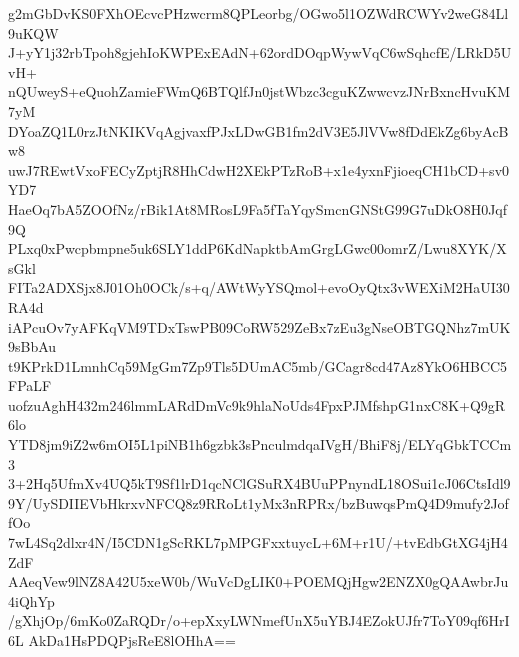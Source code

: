 g2mGbDvKS0FXhOEcvcPHzwcrm8QPLeorbg/OGwo5l1OZWdRCWYv2weG84Ll9uKQW
J+yY1j32rbTpoh8gjehIoKWPExEAdN+62ordDOqpWywVqC6wSqhcfE/LRkD5UvH+
nQUweyS+eQuohZamieFWmQ6BTQlfJn0jstWbzc3cguKZwwcvzJNrBxncHvuKM7yM
DYoaZQ1L0rzJtNKIKVqAgjvaxfPJxLDwGB1fm2dV3E5JlVVw8fDdEkZg6byAcBw8
uwJ7REwtVxoFECyZptjR8HhCdwH2XEkPTzRoB+x1e4yxnFjioeqCH1bCD+sv0YD7
HaeOq7bA5ZOOfNz/rBik1At8MRosL9Fa5fTaYqySmcnGNStG99G7uDkO8H0Jqf9Q
PLxq0xPwcpbmpne5uk6SLY1ddP6KdNapktbAmGrgLGwc00omrZ/Lwu8XYK/XsGkl
FITa2ADXSjx8J01Oh0OCk/s+q/AWtWyYSQmol+evoOyQtx3vWEXiM2HaUI30RA4d
iAPcuOv7yAFKqVM9TDxTswPB09CoRW529ZeBx7zEu3gNseOBTGQNhz7mUK9sBbAu
t9KPrkD1LmnhCq59MgGm7Zp9Tls5DUmAC5mb/GCagr8cd47Az8YkO6HBCC5FPaLF
uofzuAghH432m246lmmLARdDmVc9k9hlaNoUds4FpxPJMfshpG1nxC8K+Q9gR6lo
YTD8jm9iZ2w6mOI5L1piNB1h6gzbk3sPnculmdqaIVgH/BhiF8j/ELYqGbkTCCm3
3+2Hq5UfmXv4UQ5kT9Sf1lrD1qcNClGSuRX4BUuPPnyndL18OSui1cJ06CtsIdl9
9Y/UySDIIEVbHkrxvNFCQ8z9RRoLt1yMx3nRPRx/bzBuwqsPmQ4D9mufy2JoffOo
7wL4Sq2dlxr4N/I5CDN1gScRKL7pMPGFxxtuycL+6M+r1U/+tvEdbGtXG4jH4ZdF
AAeqVew9lNZ8A42U5xeW0b/WuVcDgLIK0+POEMQjHgw2ENZX0gQAAwbrJu4iQhYp
/gXhjOp/6mKo0ZaRQDr/o+epXxyLWNmefUnX5uYBJ4EZokUJfr7ToY09qf6HrI6L
AkDa1HsPDQPjsReE8lOHhA==

